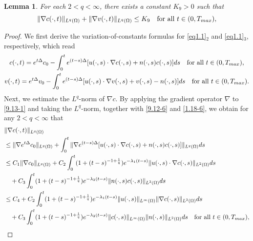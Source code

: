 \documentclass[10pt,a4paper]{amsart}
\numberwithin{equation}{section}
\newtheorem{lemma}[theo]{Lemma}
\begin{document}
\begin{lemma}\label{lem3.8}
For each $ 2 <q <\infty$, there exists a constant $K_9>0$ such that
\begin{equation}\label{3.66}
\|\nabla c(\cdot, t)\|_{L^q(\Omega)} + \|\nabla v(\cdot, t)\|_{L^q(\Omega)} 
\leq K_9 \quad \text{for all } t \in (0, T_{\rm max}),
\end{equation}
\end{lemma}

\begin{proof} 
We first derive the variation-of-constants formulas for \eqref{eq1.1}$_2$ and 
\eqref{eq1.1}$_3$, respectively, which read
\begin{gather}\label{9.13-1}
c(\cdot, t) = e^{t\Delta} c_0- \int_{0}^t e^{(t - s)\Delta} 
[ u(\cdot, s) \cdot \nabla c(\cdot, s) + n(\cdot, s)c(\cdot, s) ] ds 
\quad \text{for all } t \in (0, T_{\rm max}), \\
\label{9.13-2}
v(\cdot, t) = e^{t\Delta} v_0 - \int_{0}^t e^{(t - s)\Delta} [ u(\cdot, s) 
\cdot \nabla v(\cdot, s) + v(\cdot, s) - n(\cdot, s) ] ds \quad \text{for all
} t \in (0, T_{\rm max}).
\end{gather}
Next, we estimate the $L^q$-norm of $\nabla c$. By applying the gradient operator 
$\nabla$ to \eqref{9.13-1} and taking the $L^q$-norm, together with \eqref{9.12-6} 
and \eqref{1.18-6}, we obtain  for any $2<q <\infty$ that
\begin{align*}
&\|\nabla c(\cdot, t)\|_{L^q(\Omega)} \\&\leq \| \nabla e^{t\Delta} 
 c_0 \|_{L^q(\Omega)} + \int_{0}^t \| \nabla e^{(t - s)\Delta} [ u(\cdot, s) \cdot
\nabla c(\cdot, s) + n(\cdot, s)c(\cdot, s) ] \|_{L^q(\Omega)} ds \\
&\leq C_1\| \nabla c_0\|_{L^q(\Omega)} + C_2 \int_{0}^t (1 + (t - s)^{-1 + \frac{1}{q}})
 e^{-\lambda_1(t - s)} \| u(\cdot, s) \cdot \nabla c(\cdot, s)
\|_{L^2(\Omega)} ds \\
&\quad + C_3 \int_0^t (1 + (t - s)^{-1 + \frac{1}{q}}) e^{-\lambda_2(t - s)} 
 \|  n(\cdot, s)c(\cdot, s)  \|_{L^2(\Omega)} ds\\
&\leq C_4 + C_2 \int_{0}^t (1 + (t - s)^{-1 + \frac{1}{q}}) e^{-\lambda_1(t - s)} 
\| u(\cdot, s) \|_{L^\infty(\Omega)} \|
\nabla c(\cdot, s) \|_{L^2(\Omega)} ds\\
&\quad + C_3 \int_{0}^t (1 + (t - s)^{-1 + \frac{1}{q}}) e^{-\lambda_2(t - s)} 
\| c(\cdot, s) \|_{L^\infty(\Omega)} \| n(\cdot, s) \|_{L^2(\Omega)} ds
\quad \text{for all } t \in (0, T_{\rm max}),
\end{align*}

\end{proof}
\end{document}
